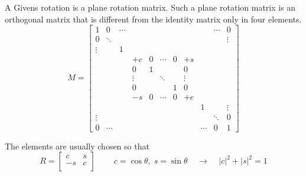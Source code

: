 A Givens rotation is a plane rotation matrix.  Such a plane rotation
matrix is an orthogonal matrix that is different from the identity
matrix only in four elements.
\begin{equation}
\label{eq:rotation}
M =
\left[
\begin{array}{ccccccccccc}
1 & 0 & \cdots &  &  &  &  &  &  & \cdots & 0\\
0 & \ddots &  &  &  &  &  &  &  &  & \vdots\\
\vdots &  & 1 &  &  &  &  &  &  &  & \\
 &  &  & +c & 0 & \cdots & 0 & +s &  &  & \\
 &  &  & 0 & 1 &  &  & 0 &  &  & \\
 &  &  & \vdots &  & \ddots &  & \vdots &  &  & \\
 &  &  & 0 &  &  & 1 & 0 &  &  & \\
 &  &  & -s & 0 & \cdots & 0 & +c &  &  & \\
 &  &  &  &  &  &  &  & 1 &  & \vdots\\
\vdots &  &  &  &  &  &  &  &  & \ddots & 0\\
0 & \cdots &  &  &  &  &  &  & \cdots & 0 & 1
\end{array}
\right]
\end{equation}

The elements are usually chosen so that
\begin{equation}
\label{eq:givenscond}
R =
\left[\begin{array}{rl}
c & s\\
-s & c\\
\end{array}\right]
\;\;\;\;  \;\;\;\;
c = \cos{\theta},\; s = \sin{\theta}
\;\;\;\; \rightarrow \;\;\;\;
\left|c\right|^2 + \left|s\right|^2 = 1
\end{equation}


